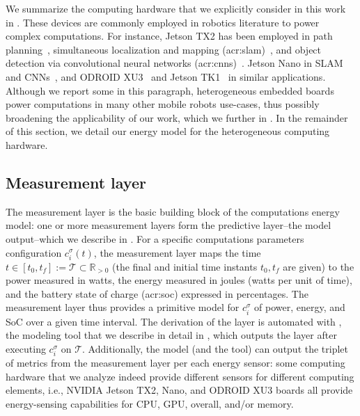 We summarize the computing hardware that we explicitly consider in this work in . These devices are commonly employed in robotics literature to power complex computations. For instance, Jetson TX2 has been employed in path planning~\citep{dharmadhikari2020motion,ryou2018applying}, simultaneous localization and mapping (\Gls{acr:slam})~\citep{aldegheri2019data}, and object detection via convolutional neural networks (\Gls{acr:cnn}s)~\citep{william2019aerial}. Jetson Nano in SLAM and CNNs~\citep{peng2019evaluating,wang2020yolo,alexey2021autonomous}, and ODROID XU3~\citep{bhat2019power,papachristos2015aerial,giusti2016machine} and Jetson TK1~\citep{gong2016low,holper2017cyber} in similar applications. Although we report some in this paragraph, heterogeneous embedded boards power computations in many other mobile robots use-cases, thus possibly broadening the applicability of our work, which we further in . In the remainder of this section, we detail our energy model for the heterogeneous computing hardware.

\subsection{Measurement layer}
\label{sec:measurement-layer}

The measurement layer is the basic building block of the computations energy model: one or more measurement layers form the predictive layer--the model output--which we describe in . For a specific computations parameters configuration $c_i^\sigma(t)$, the measurement layer maps the time $t\in[t_0,t_f]:=\mathcal{T}\subset\mathbb{R}_{>0}$ (the final and initial time instants $t_0,t_f$ are given) to the power measured in watts, the energy measured in joules (watts per unit of time), and the battery state of charge (\Gls{acr:soc}) expressed in percentages. The measurement layer thus provides a primitive model for $c_i^\sigma$ of power, energy, and SoC over a given time interval. The derivation of the layer is automated with \powprof{}, the modeling tool that we describe in detail in , which outputs the layer after executing $c_i^\sigma$ on $\mathcal{T}$. Additionally, the model (and the \powprof{} tool) can output the triplet of metrics from the measurement layer per each energy sensor: some computing hardware that we analyze indeed provide different sensors for different computing elements, i.e., NVIDIA Jetson TX2, Nano, and ODROID XU3 boards all provide energy-sensing capabilities for CPU, GPU, overall, and/or memory.


